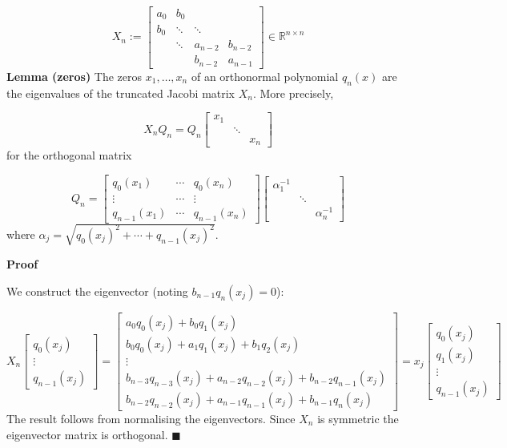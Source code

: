 \documentclass[12pt,a4paper]{article}
\def\bbR{ {\mathbb R} }
\begin{document}
\[
X_n := \begin{bmatrix} a_0 & b_0 \\
                         b_0 & \ensuremath{\ddots} & \ensuremath{\ddots} \\
                         & \ensuremath{\ddots} & a_{n-2} & b_{n-2} \\
                         && b_{n-2} & a_{n-1} \end{bmatrix} \ensuremath{\in} \ensuremath{\bbR}^{n \ensuremath{\times} n}
\]
\textbf{Lemma (zeros)} The zeros $x_1, \ensuremath{\ldots},x_n$ of an orthonormal polynomial $q_n(x)$ are the eigenvalues of the truncated Jacobi matrix $X_n$. More precisely,

\[
X_n Q_n = Q_n \begin{bmatrix} x_1 \\ & \ensuremath{\ddots} \\ && x_n \end{bmatrix}
\]
for the orthogonal matrix

\[
Q_n = \begin{bmatrix}
q_0(x_1) & \ensuremath{\cdots} & q_0(x_n) \\
\ensuremath{\vdots}  & \ensuremath{\cdots} & \ensuremath{\vdots}  \\
q_{n-1}(x_1) & \ensuremath{\cdots} & q_{n-1}(x_n)
\end{bmatrix} \begin{bmatrix} \ensuremath{\alpha}_1^{-1} \\ & \ensuremath{\ddots} \\ && \ensuremath{\alpha}_n^{-1} \end{bmatrix}
\]
where $\ensuremath{\alpha}_j = \sqrt{q_0(x_j)^2 + \ensuremath{\cdots} + q_{n-1}(x_j)^2}$.

\textbf{Proof}

We construct the eigenvector (noting $b_{n-1} q_n(x_j) = 0$):

\[
X_n \begin{bmatrix} q_0(x_j) \\ \ensuremath{\vdots} \\ q_{n-1}(x_j) \end{bmatrix} =
\begin{bmatrix} a_0 q_0(x_j) + b_0 q_1(x_j) \\
 b_0 q_0(x_j) + a_1 q_1(x_j) + b_1 q_2(x_j) \\
\ensuremath{\vdots} \\
b_{n-3} q_{n-3}(x_j) + a_{n-2} q_{n-2}(x_j) + b_{n-2} q_{n-1}(x_j) \\
b_{n-2} q_{n-2}(x_j) + a_{n-1} q_{n-1}(x_j) + b_{n-1} q_n(x_j)
\end{bmatrix} = x_j \begin{bmatrix} q_0(x_j) \\
 q_1(x_j) \\
\ensuremath{\vdots} \\
q_{n-1}(x_j)
\end{bmatrix}
\]
The result follows from normalising the eigenvectors. Since $X_n$ is symmetric the eigenvector matrix is orthogonal. $\blacksquare$
\end{document}
